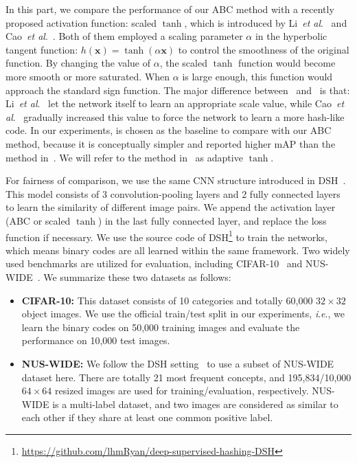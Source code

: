 \documentclass[runningheads]{llncs}
\newcommand{\etal}{\textit{et al}.}
\newcommand{\ie}{\textit{i}.\textit{e}.}
\begin{document}
In this part, we compare the performance of our ABC method with a recently proposed activation function: scaled $\tanh$, which is introduced by Li~\etal~\cite{Li17ACMMM_r14} and Cao~\etal~\cite{Cao17ICCV_r15}. Both of them employed a scaling parameter $\alpha$ in the hyperbolic tangent function: $h(\mathbf{x})=\tanh(\alpha \mathbf{x})$ to control the smoothness of the original function. By changing the value of $\alpha$, the scaled $\tanh$ function would become more smooth or more saturated. When $\alpha$ is large enough, this function would approach the standard sign function. The major difference between~\cite{Li17ACMMM_r14} and~\cite{Cao17ICCV_r15} is that: Li~\etal~\cite{Li17ACMMM_r14} let the network itself to learn an appropriate scale value, while Cao~\etal~\cite{Cao17ICCV_r15} gradually increased this value to force the network to learn a more hash-like code. In our experiments, \cite{Cao17ICCV_r15} is chosen as the baseline to compare with our ABC method, because it is conceptually simpler and reported higher mAP than the method in~\cite{Li17ACMMM_r14}. We will refer to the method in~\cite{Cao17ICCV_r15} as adaptive $\tanh$.

For fairness of comparison, we use the same CNN structure introduced in DSH~\cite{Liu16CVPR_r12}. This model consists of 3 convolution-pooling layers and 2 fully connected layers to learn the similarity of different image pairs. We append the activation layer (ABC or scaled $\tanh$) in the last fully connected layer, and replace the loss function if necessary. We use the source code of DSH\footnote{\url{https://github.com/lhmRyan/deep-supervised-hashing-DSH}} to train the networks, which means binary codes are all learned within the same framework. Two widely used benchmarks are utilized for evaluation, including CIFAR-10~\cite{cifar_10} and NUS-WIDE~\cite{NUS_WIDE}. We summarize these two datasets as follows:

\begin{itemize}
	\item \textbf{CIFAR-10: }This dataset consists of 10 categories and totally 60,000 $32\times 32$ object images. We use the official train/test split in our experiments, \ie, we learn the binary codes on 50,000 training images and evaluate the performance on 10,000 test images. 
	\item \textbf{NUS-WIDE: }We follow the DSH setting~\cite{Liu16CVPR_r12} to use a subset of NUS-WIDE dataset here. There are totally 21 most frequent concepts, and 195,834/10,000 $64\times 64$ resized images are used for training/evaluation, respectively. NUS-WIDE is a multi-label dataset, and two images are considered as similar to each other if they share at least one common positive label.
\end{itemize}
\end{document}
